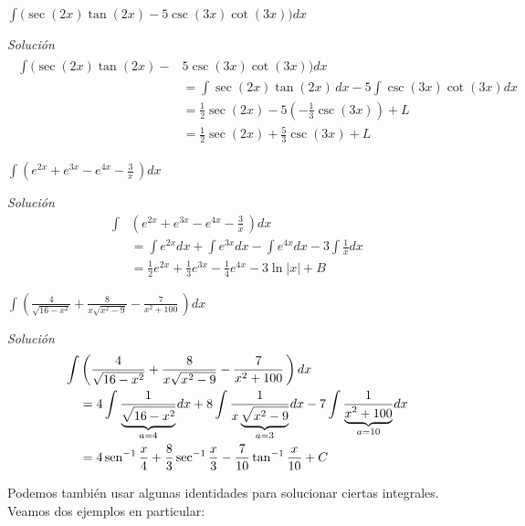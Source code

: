 \begin{parrafonumerado}
\item $\int \bigl(\sec (2x)\tan (2x)-5\csc (3x)\cot (3x)\bigr)dx$

  \vspace{\parskip}

  \emph{Solución}
  \begin{gather*}
    \begin{aligned}
      \int \bigl(\sec (2x)\tan (2x)-&5\csc (3x)\cot (3x)\bigr)dx\\
      &=\int \sec (2x)\tan (2x)\,dx - 5\int \csc (3x)\cot (3x)dx\\
      &=\frac{1}{2}\sec (2x)-5\left(-\frac{1}{3}\csc (3x)\right)+L\\
      &=\frac{1}{2}\sec (2x)+\frac{5}{3}\csc (3x)+L
    \end{aligned}
  \end{gather*}

\item $\int \left(e^{2x}+e^{3x}-e^{4x}-\frac{3}{x}\,\right)dx$

  \vspace{\parskip}

  \emph{Solución}
  \begin{align*}
    \int & \left(e^{2x}+e^{3x}-e^{4x}-\frac{3}{x}\,\right)dx \\
    &=\int e^{2x}dx+\int e^{3x}dx-\int e^{4x}dx-3\int \frac{1}{x}dx\\
    &=\frac{1}{2}e^{2x}+\frac{1}{3}e^{3x}-\frac{1}{4}e^{4x}-3\ln |x|+B
  \end{align*}

\item $\int\left( \frac{4}{\sqrt{16-x^{2}}}+\frac{8}{x\sqrt{x^{2}-9}}-\frac{7}{x^{2}+100}\,\right)dx$

  \vspace{\parskip}

  \emph{Solución}
  \begin{align*}
    \int&\left( \frac{4}{\sqrt{16-x^{2}}}+\frac{8}{x\sqrt{x^{2}-9}}-\frac{7}{%
    x^{2}+100}\,\right)dx\\
    &= 4\int \frac{1}{\underbrace{\sqrt{16-x^{2}}}_{a=4}}dx+8\int \frac{1}{x\underbrace{\sqrt{x^{2}-9}}_{a=3}}dx-7\int
    \frac{1}{\underbrace{x^{2}+100}_{a=10}}dx\\
    &=4\sen^{-1} \frac{x}{4}+\frac{8}{3}\sec^{-1}\frac{x}{3}-\frac{7}{10}%
    \tan^{-1} \frac{x}{10}+C
  \end{align*}
\end{parrafonumerado}

\begin{ejemplo}
  Podemos también usar algunas identidades para solucionar ciertas integrales. Veamos dos ejemplos en particular:
\end{ejemplo}

